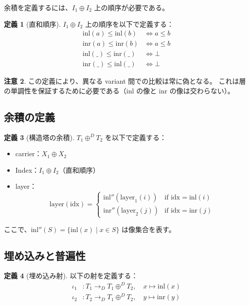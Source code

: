 \documentclass[a4paper,11pt]{ltjsarticle}
\theoremstyle{definition}
\newtheorem{definition}{定義}[section]
\newtheorem{remark}[definition]{注意}
\begin{document}
余積を定義するには、$I_1 \oplus I_2$ 上の順序が必要である。

\begin{definition}[直和順序]
$I_1 \oplus I_2$ 上の順序を以下で定義する：
\begin{align*}
  \mathrm{inl}(a) \leq \mathrm{inl}(b) &\Leftrightarrow a \leq b \\
  \mathrm{inr}(a) \leq \mathrm{inr}(b) &\Leftrightarrow a \leq b \\
  \mathrm{inl}(\_) \leq \mathrm{inr}(\_) &\Leftrightarrow \bot \\
  \mathrm{inr}(\_) \leq \mathrm{inl}(\_) &\Leftrightarrow \bot
\end{align*}
\end{definition}

\begin{remark}
この定義により、異なる variant 間での比較は常に偽となる。
これは層の単調性を保証するために必要である（$\mathrm{inl}$ の像と $\mathrm{inr}$ の像は交わらない）。
\end{remark}

\subsection{余積の定義}

\begin{definition}[構造塔の余積]
$T_1 \oplus^D T_2$ を以下で定義する：
\begin{itemize}
  \item carrier：$X_1 \oplus X_2$
  \item Index：$I_1 \oplus I_2$（直和順序）
  \item layer：
  \[
  \mathrm{layer}(\mathrm{idx}) = \begin{cases}
    \mathrm{inl}''(\mathrm{layer}_1(i)) & \text{if } \mathrm{idx} = \mathrm{inl}(i) \\
    \mathrm{inr}''(\mathrm{layer}_2(j)) & \text{if } \mathrm{idx} = \mathrm{inr}(j)
  \end{cases}
  \]
\end{itemize}
ここで、$\mathrm{inl}''(S) = \{\mathrm{inl}(x) \mid x \in S\}$ は像集合を表す。
\end{definition}

\subsection{埋め込みと普遍性}

\begin{definition}[埋め込み射]
以下の射を定義する：
\begin{align*}
  \iota_1 &: T_1 \to_D T_1 \oplus^D T_2, \quad x \mapsto \mathrm{inl}(x) \\
  \iota_2 &: T_2 \to_D T_1 \oplus^D T_2, \quad y \mapsto \mathrm{inr}(y)
\end{align*}
\end{definition}
\end{document}
